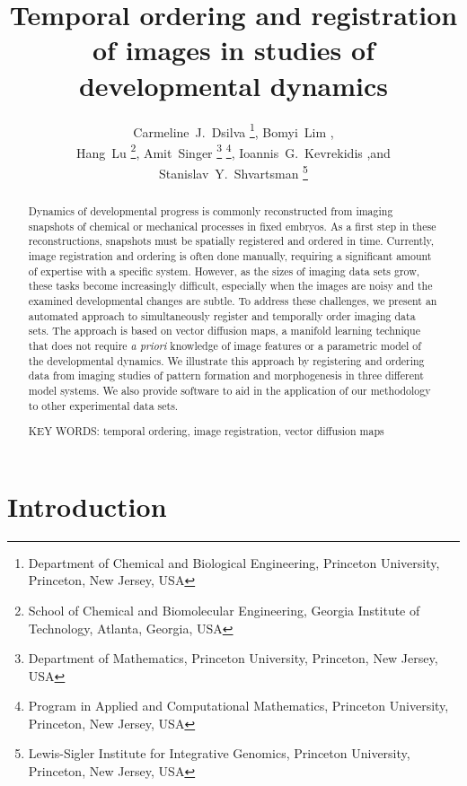 \documentclass[twocolumn, 10pt]{article}
\title{Temporal ordering and registration of images in studies of developmental dynamics}
\author{Carmeline~J.~Dsilva \thanks{Department of Chemical and Biological Engineering, Princeton University, Princeton, New Jersey, USA},
Bomyi~Lim \footnotemark[1], \\
Hang~Lu \thanks{School of Chemical and Biomolecular Engineering, Georgia Institute of Technology, Atlanta, Georgia, USA},
Amit~Singer \thanks{Department of Mathematics, Princeton University, Princeton, New Jersey, USA} \thanks{Program in Applied and Computational Mathematics, Princeton University, Princeton, New Jersey, USA}, Ioannis~G.~Kevrekidis \footnotemark[1] \footnotemark[4] ,and
Stanislav~Y.~Shvartsman \footnotemark[1] \thanks{Lewis-Sigler Institute for Integrative Genomics, Princeton University, Princeton, New Jersey, USA}}
\date{}
\begin{document}
\maketitle

\begin{abstract}

Dynamics of developmental progress is commonly reconstructed from imaging snapshots of chemical or mechanical processes in fixed embryos.
%
As a first step in these reconstructions, snapshots must be spatially registered and ordered in time.
%
Currently, image registration and ordering is often done manually, requiring a significant amount of expertise with a specific system.
%
However, as the sizes of imaging data sets grow, these tasks become increasingly difficult, especially when the images are noisy and the examined developmental changes are subtle.
%
To address these challenges, we present an automated approach to simultaneously register and temporally order imaging data sets.
%
The approach is based on vector diffusion maps, a manifold learning technique that does not require \textit{a priori} knowledge of image features or a parametric model of the developmental dynamics.
%
We illustrate this approach by registering and ordering data from imaging studies of pattern formation and morphogenesis in three different model systems.
%
We also provide software to aid in the application of our methodology to other experimental data sets.
\vspace{1em}

\noindent
KEY WORDS: temporal ordering, image registration, vector diffusion maps

\end{abstract}



\section*{Introduction}
\end{document}
